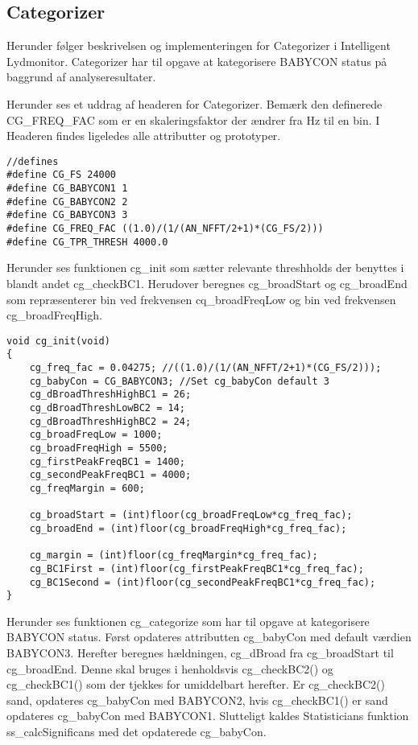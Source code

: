 \subsection*{Categorizer}
Herunder følger beskrivelsen og implementeringen for Categorizer i Intelligent Lydmonitor.
Categorizer har til opgave at kategorisere BABYCON status på baggrund af analyseresultater. 


Herunder ses et uddrag af headeren for Categorizer. Bemærk den definerede CG\_FREQ\_FAC som er en skaleringsfaktor der ændrer fra Hz til en bin. I Headeren findes ligeledes alle attributter og prototyper.

\begin{verbatim}//defines
#define CG_FS 24000
#define CG_BABYCON1 1
#define CG_BABYCON2 2
#define CG_BABYCON3 3
#define CG_FREQ_FAC ((1.0)/(1/(AN_NFFT/2+1)*(CG_FS/2)))
#define CG_TPR_THRESH 4000.0
\end{verbatim}

Herunder ses funktionen cg\_init som sætter relevante threshholds der benyttes i blandt andet cg\_checkBC1. Herudover beregnes cg\_broadStart og cg\_broadEnd som repræsenterer bin ved frekvensen cq\_broadFreqLow og bin ved frekvensen cg\_broadFreqHigh. 

\begin{verbatim}void cg_init(void)
{
    cg_freq_fac = 0.04275; //((1.0)/(1/(AN_NFFT/2+1)*(CG_FS/2)));
    cg_babyCon = CG_BABYCON3; //Set cg_babyCon default 3
    cg_dBroadThreshHighBC1 = 26;
    cg_dBroadThreshLowBC2 = 14;
    cg_dBroadThreshHighBC2 = 24;
    cg_broadFreqLow = 1000;
    cg_broadFreqHigh = 5500;
    cg_firstPeakFreqBC1 = 1400;
    cg_secondPeakFreqBC1 = 4000;
    cg_freqMargin = 600;

    cg_broadStart = (int)floor(cg_broadFreqLow*cg_freq_fac);
    cg_broadEnd = (int)floor(cg_broadFreqHigh*cg_freq_fac);

    cg_margin = (int)floor(cg_freqMargin*cg_freq_fac);
    cg_BC1First = (int)floor(cg_firstPeakFreqBC1*cg_freq_fac);
    cg_BC1Second = (int)floor(cg_secondPeakFreqBC1*cg_freq_fac);
}
\end{verbatim}

Herunder ses funktionen cg\_categorize som har til opgave at kategorisere BABYCON status. 
Først opdateres attributten cg\_babyCon med default værdien BABYCON3. 
Herefter beregnes hældningen, cg\_dBroad fra cg\_broadStart til cg\_broadEnd. Denne skal bruges i henholdsvis cg\_checkBC2() og cg\_checkBC1() som der tjekkes for umiddelbart herefter. Er cg\_checkBC2() sand, opdateres cg\_babyCon med BABYCON2, hvis cg\_checkBC1() er sand opdateres cg\_babyCon med BABYCON1.
Slutteligt kaldes Statisticians funktion ss\_calcSignificans med det opdaterede cg\_babyCon.

